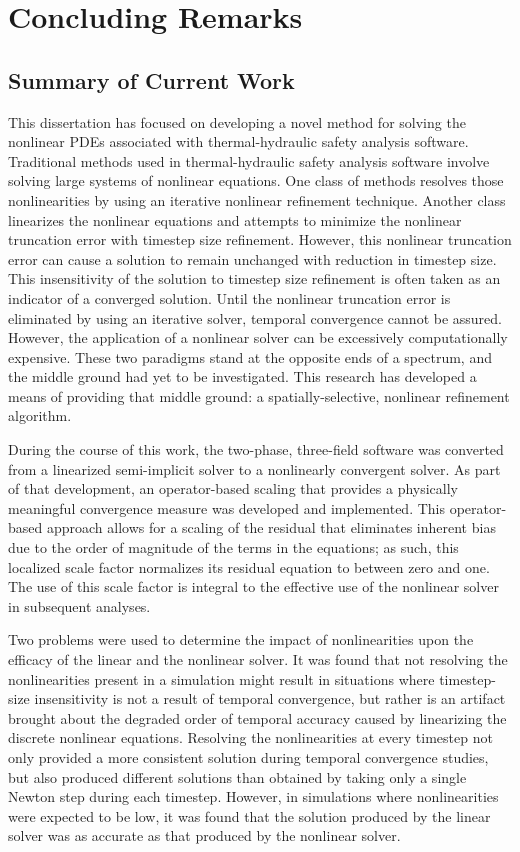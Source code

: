 \chapter{Concluding Remarks}
\label{chap:end}

\section{Summary of Current Work}
\label{section:summary}
This dissertation has focused on developing a novel method for solving the nonlinear PDEs associated with thermal-hydraulic safety analysis software.
Traditional methods used in thermal-hydraulic safety analysis software involve solving large systems of nonlinear equations.
One class of methods resolves those nonlinearities by using an iterative nonlinear refinement technique.
Another class linearizes the nonlinear equations and attempts to minimize the nonlinear truncation error with timestep size refinement.
However, this nonlinear truncation error can cause a solution to remain unchanged with reduction in timestep size.
This insensitivity of the solution to timestep size refinement is often taken as an indicator of a converged solution. 
Until the nonlinear truncation error is eliminated by using an iterative solver, temporal convergence cannot be assured.
However, the application of a nonlinear solver can be excessively computationally expensive.
These two paradigms stand at the opposite ends of a spectrum, and the middle ground had yet to be investigated.
This research has developed a means of providing that middle ground: a spatially-selective, nonlinear refinement algorithm.

During the course of this work, the two-phase, three-field software \cobra{} was converted from a linearized semi-implicit solver to a nonlinearly convergent solver.
As part of that development, an operator-based scaling that provides a physically meaningful convergence measure was developed and implemented.
This operator-based approach allows for a scaling of the residual that eliminates inherent bias due to the order of magnitude of the terms in the equations; as such, this localized scale factor normalizes its residual equation to between zero and one.
The use of this scale factor is integral to the effective use of the nonlinear solver in  subsequent analyses.

Two problems were used to determine the impact of nonlinearities upon the efficacy of the linear and the nonlinear solver.
It was found that not resolving the nonlinearities present in a simulation might result in situations where timestep-size insensitivity is not a result of temporal convergence, but rather is an artifact brought about the degraded order of temporal accuracy caused by linearizing the discrete nonlinear equations.
Resolving the nonlinearities at every timestep not only provided a more consistent solution during temporal convergence studies, but also produced different solutions than obtained by taking only a single Newton step during each timestep.
However, in simulations where nonlinearities were expected to be low, it was found that the solution produced by the linear solver was as accurate as that produced by the nonlinear solver.


